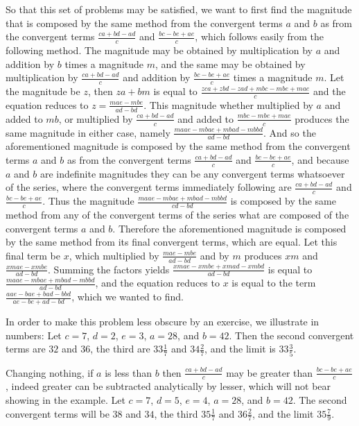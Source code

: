\documentclass[11pt,letterpaper]{book}
\begin{document}
So that this set of problems may be satisfied, we want to first find the
magnitude that is composed by the same method from the convergent terms $a$ and
$b$ as from the convergent terms $\frac{ca+bd-ad}{c}$ and $\frac{bc-be+ae}{c}$,
which follows easily from the following method. The magnitude may be obtained by
multiplication by $a$ and addition by $b$ times a magnitude $m$, and the same may
be obtained by multiplication by $\frac{ca+bd-ad}{c}$ and addition by
$\frac{bc-be+ae}{c}$ times a magnitude $m$. Let the magnitude be $z$, then $za+bm$
is equal to $\frac{zca + zbd - zad + mbc - mbe + mae}{c}$ and the equation
reduces to $z = \frac{mae - mbe}{ad - bd}$. This magnitude whether multiplied by
$a$ and added to $mb$, or multiplied by $\frac{ca+bd-ad}{c}$ and added to
$\frac{mbc-mbe+mae}{c}$ produces the same magnitude in either case, namely
$\frac{maae - mbae + mbad - mbbd}{ad - bd}$. And so the aforementioned
magnitude is composed by the same method from the convergent terms $a$ and $b$
as from the convergent terms $\frac{ca+bd-ad}{c}$ and $\frac{bc-be+ae}{c}$, and
because $a$ and $b$ are indefinite magnitudes they can be any convergent terms
whatsoever of the series, where the convergent terms immediately following are
$\frac{ca+bd-ad}{c}$ and $\frac{bc-be+ae}{c}$. Thus the magnitude $\frac{maae -
mbae + mbad - mbbd}{cd - bd}$ is composed by the same method from any of the
convergent terms of the series what are composed of the convergent terms $a$ and
$b$. Therefore the aforementioned magnitude is composed by the same method from
its final convergent terms, which are equal. Let this final term be $x$, which
multiplied by $\frac{mae - mbe}{ad - bd}$ and by $m$ produces $xm$ and
$\frac{xmae - xmbe}{ad - bd}$. Summing the factors yields $\frac{xmae - xmbe
+ xmad - xmbd}{ad - bd}$ is equal to $\frac{maae - mbae + mbad - mbbd}{ad -
bd}$, and the equation reduces to $x$ is equal to the term $\frac{aae - bae +
bad - bbd}{ae - be + ad - bd}$, which we wanted to find.

In order to make this problem less obscure by an exercise, we illustrate in
numbers: Let $c = 7$, $d = 2$, $e = 3$, $a = 28$, and $b = 42$. Then the second
convergent terms are $32$ and $36$, the third are $33\frac{1}{7}$ and
$34\frac{2}{7}$, and the limit is $33\frac{3}{5}$.

Changing nothing, if $a$ is less than $b$ then $\frac{ca+bd-ad}{c}$ may be
greater than $\frac{bc-be+ae}{c}$, indeed greater can be subtracted analytically
by lesser, which will not bear showing in the example. Let $c = 7$, $d
= 5$, $e = 4$, $a = 28$, and $b = 42$. The second convergent terms will be $38$
and $34$, the third $35\frac{1}{7}$ and $36\frac{2}{7}$, and the limit
$35\frac{7}{9}$.
\end{document}
